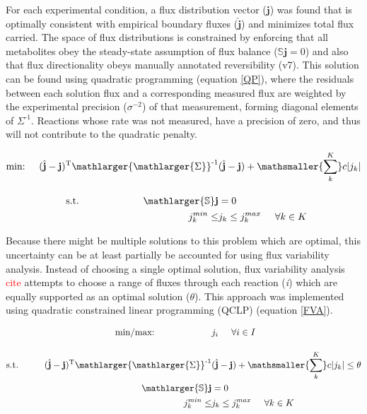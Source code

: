For each experimental condition, a flux distribution vector ($\mathbf{j}$) was found that is optimally consistent with empirical boundary fluxes ($\hat{\mathbf{j}}$) and minimizes total flux carried.  The space of flux distributions is constrained by enforcing that all metabolites obey the steady-state assumption of flux balance ($\mathbb{S}\mathbf{j} = 0$) and also that flux directionality obeys manually annotated reversibility (v7).  This solution can be found using quadratic programming (equation \ref{QP}), where the residuals between each solution flux and a corresponding measured flux are weighted by the experimental precision ($\sigma^{-2}$) of that measurement, forming diagonal elements of $\Sigma^{\text{-}1}$.  Reactions whose rate was not measured, have a precision of zero, and thus will not contribute to the quadratic penalty.

\begin{align}
\text{min:} \hspace{5mm} (\hat{\mathbf{j}} - \mathbf{j})^{\text{T}}\mathlarger{\mathlarger{\Sigma}}^{\text{-1}}&(\hat{\mathbf{j}} - \mathbf{j}) + \mathsmaller{\sum_{k}^{K}}c|j_{k}| \notag\\[1em]
\text{s.t.} \hspace{23mm} \mathlarger{\mathbb{S}}\mathbf{j} &= 0 \notag\\
\hspace{5mm} j_{k}^{min} \le &j_{k} \le j_{k}^{max} \hspace{5mm}\forall k \in K \label{QP}
\end{align}

Because there might be multiple solutions to this problem which are optimal, this uncertainty can be at least partially be accounted for using flux variability analysis.  Instead of choosing a single optimal solution, flux variability analysis \textcolor{red}{cite} attempts to choose a range of fluxes through each reaction (\textit{i}) which are equally supported as an optimal solution ($\theta$).  This approach was implemented using quadratic constrained linear programming (QCLP) (equation \ref{FVA}).  

\begin{align}
\text{min/max:} \hspace{22mm} & j_{i}\hspace{5mm}\forall i \in I\notag\\[1em]
\text{s.t.} \hspace{10mm} (\hat{\mathbf{j}} - \mathbf{j})^{\text{T}}\mathlarger{\mathlarger{\Sigma}}^{\text{-1}}&(\hat{\mathbf{j}} - \mathbf{j}) + \mathsmaller{\sum_{k}^{K}}c|j_{k}| \le \theta \notag\\
\mathlarger{\mathbb{S}}\mathbf{j} &= 0 \notag\\
\hspace{5mm} j_{k}^{min} \le &j_{k} \le j_{k}^{max} \hspace{5mm}\forall k \in K \label{FVA}
\end{align}

